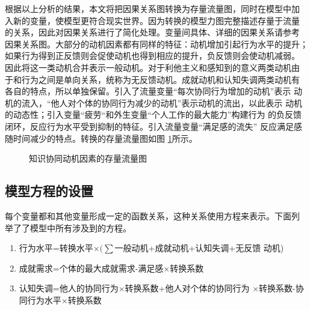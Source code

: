 根据以上分析的结果，本文将把因果关系图转换为存量流量图，同时在模型中加
入新的变量，使模型更符合现实世界。因为转换的模型力图完整描述存量于流量
的关系，因此对因果关系进行了简化处理。变量间具体、详细的因果关系请参考
因果关系图。大部分的动机因素都有同样的特征：动机增加引起行为水平的提升；
如果行为得到正反馈则会促使动机也得到相应的提升，负反馈则会使动机减弱。
因此将这一类动机合并表示一般动机。对于利他主义和感知到的意义两类动机由
于和行为之间是单向关系，统称为无反馈动机。成就动机和认知失调两类动机有
各自的特点，所以单独保留。引入了流量变量“每次协同行为增加的动机”表示
动机的流入，“他人对个体的协同行为减少的动机”表示动机的流出，以此表示
动机的动态性；引入变量“疲劳“和外生变量“个人工作的最大能力”构建行为
的负反馈闭环，反应行为水平受到抑制的特征。引入流量变量“满足感的流失”
反应满足感随时间减少的特点。转换的存量流量图如图
\ref{fig:refined-model}所示。
\begin{figure}[htb]
  \centering
  \caption{\small{知识协同动机因素的存量流量图}}
  \label{fig:refined-model}
\end{figure}

\subsection{模型方程的设置}

每个变量都和其他变量形成一定的函数关系，这种关系使用方程来表示。下面列
举了了模型中所有涉及到的方程。
\begin{enumerate}
\item 行为水平=转换水平$\times (\sum$一般动机+成就动机+认知失调+无反馈
  动机)
\item 成就需求=个体的最大成就需求-满足感$\times$转换系数
\item 认知失调=他人的协同行为$\times$转换系数+他人对个体的协同行为
  $\times$转换系数-协同行为水平$\times$转换系数
\end{enumerate}

